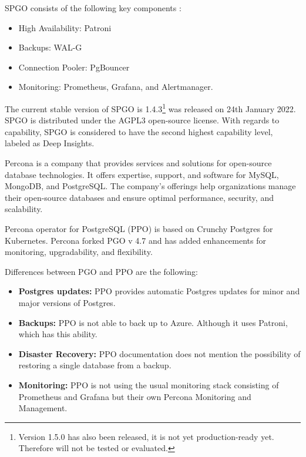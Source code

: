 SPGO consists of the following key components \cite{PostgresOnKubernetes}:
\begin{itemize}
    \item High Availability: Patroni
    \item Backups: WAL-G
    \item Connection Pooler: PgBouncer
    \item Monitoring: Prometheus, Grafana, and Alertmanager.
\end{itemize}


The current stable version of SPGO is 1.4.3\footnote[3]{Version 1.5.0 has also been released, it is not yet production-ready yet. Therefore will not be tested or evaluated.} was released on 24th January 2022. \cite{SPGOgitlabChangelog} SPGO is distributed under the AGPL3 open-source license. \cite{SPGODocuLicence}
With regards to capability, SPGO is considered to have the second highest capability level, labeled as Deep Insights. \cite{operatorHubStackgres}

\label{chap:ppo}

Percona is a company that provides services and solutions for open-source database technologies. It offers expertise, support, and software for MySQL, MongoDB, and PostgreSQL. The company's offerings help organizations manage their open-source databases and ensure optimal performance, security, and scalability. \cite{Percona}

Percona operator for PostgreSQL (PPO) is based on Crunchy Postgres for Kubernetes. Percona forked PGO v 4.7 and has added enhancements for monitoring, upgradability, and flexibility. \cite{PerconaBlogProsAndCons}

Differences between PGO and PPO are the following:
\begin{itemize}
    \item \textbf{Postgres updates:} PPO provides automatic Postgres updates for minor and major versions of Postgres.  \cite{PerconaDocuUpdate}
    \item \textbf{Backups:} PPO is not able to back up to Azure. \cite{PerconaDocuCompare} Although it uses Patroni, which has this ability.
    \item \textbf{Disaster Recovery:} PPO documentation does not mention the possibility of restoring a single database from a backup. \cite{PerconaDocuBackups}
    \item \textbf{Monitoring:} PPO is not using the usual monitoring stack consisting of Prometheus and Grafana but their own Percona Monitoring and Management. \cite{PerconaDocuMonitoring}
\end{itemize}


